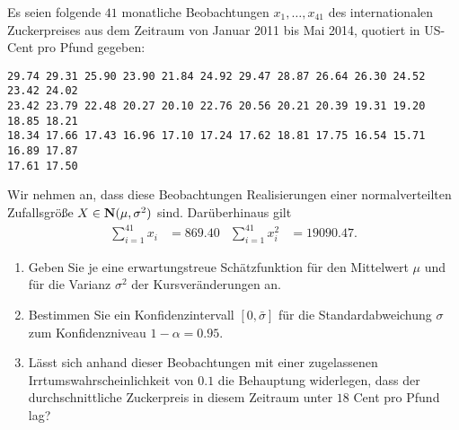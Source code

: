 Es seien folgende $41$ monatliche Beobachtungen $x_{1},\dots ,x_{41}$ des internationalen
Zuckerpreises aus dem Zeitraum von Januar 2011 bis Mai 2014, quotiert in US-Cent
pro Pfund gegeben: 
\begin{lstlisting}
29.74 29.31 25.90 23.90 21.84 24.92 29.47 28.87 26.64 26.30 24.52 23.42 24.02
23.42 23.79 22.48 20.27 20.10 22.76 20.56 20.21 20.39 19.31 19.20 18.85 18.21
18.34 17.66 17.43 16.96 17.10 17.24 17.62 18.81 17.75 16.54 15.71 16.89 17.87
17.61 17.50
\end{lstlisting}
Wir nehmen an, dass diese Beobachtungen Realisierungen einer normalverteilten Zufallsgröße
$X \in \mathbf{N}(\mu, \sigma^{2})$ sind. Darüberhinaus gilt
\begin{align*}
    \sum_{i=1}^{41} x_{i} &= 869.40 & \sum_{i=1}^{41} x_{i}^{2} &= 19090.47.
\end{align*}
\begin{enumerate}
    \item Geben Sie je eine erwartungstreue Schätzfunktion für den Mittelwert
        $\mu$ und für die Varianz $\sigma^2$ der Kursveränderungen an.
    \item Bestimmen Sie ein Konfidenzintervall $[0,\bar \sigma]$ für die
        Standardabweichung $\sigma$ zum Konfidenzniveau $1-\alpha = 0.95$.

    \item Lässt sich anhand dieser Beobachtungen mit einer zugelassenen
        Irrtumswahrscheinlichkeit von $0.1$ die Behauptung widerlegen, dass
        der durchschnittliche Zuckerpreis in diesem Zeitraum unter $18$ Cent
        pro Pfund lag?
\end{enumerate}



